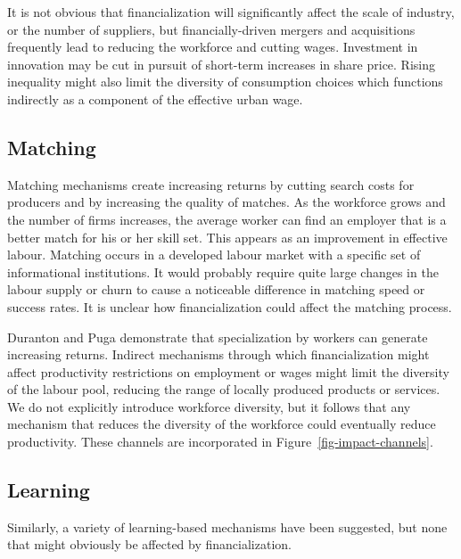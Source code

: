  
It is not obvious that financialization will significantly affect the scale of industry, or the number of suppliers, but financially-driven mergers and acquisitions frequently lead to reducing the workforce and cutting wages. Investment in innovation may be cut in pursuit of short-term increases in share price.  Rising inequality might also limit the diversity of consumption choices which functions indirectly as a component of the effective urban wage. 

 
\subsection{Matching}
Matching mechanisms create increasing returns by cutting search costs for producers and by increasing the quality of matches. As the workforce grows and the number of firms increases, the average worker can find an employer that is a better match for his or her skill set. This appears as an improvement in effective labour. Matching occurs in a developed labour market with a specific set of informational institutions. It would probably require quite large changes in the labour supply or churn to cause a noticeable difference in matching speed or success rates. It is unclear how financialization could affect the matching process.

 Duranton and Puga demonstrate that specialization by workers can generate increasing returns. Indirect mechanisms through which financialization might affect productivity restrictions on employment or wages  might limit the diversity of the labour pool, reducing the range of locally produced products or services.  We do not explicitly introduce workforce diversity, but it follows that any mechanism that reduces the diversity of the workforce could eventually reduce productivity. These channels are incorporated in Figure~\ref{fig-impact-channels}.
 

\subsection{Learning}
Similarly, a variety of learning-based mechanisms have been suggested, but none that might obviously be affected by financialization. 




